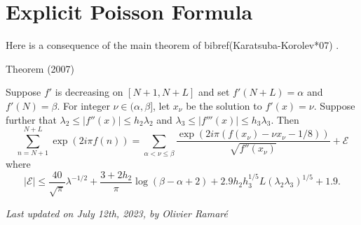 \par 
\section{Explicit Poisson Formula}


Here is a consequence of the main theorem of
bibref(Karatsuba-Korolev*07)
.
\par 
\begin{thm}{Theorem (2007)}

    Suppose $f'$ is decreasing on $[N+1,N+L]$ and set
    $f'(N+L)=\alpha$ and $f'(N) = \beta$.
    For integer $\nu\in(\alpha, \beta]$, let $x_\nu$ be the solution
    to $f'(x)=\nu$. Suppose further that
$\lambda_2\le |f''(x)|\le h_2\lambda_2$ and
    $\lambda_3\le |f'''(x)|\le h_3\lambda_3$. Then
    $$
    \sum_{n=N+1}^{N+L} \exp(2i\pi f(n))
    =
    \sum_{\alpha < \nu\le \beta}
		   \frac{\exp(2i\pi (f(x_\nu)-\nu x_\nu-1/8))}{\sqrt{f''(x_\nu)}}
		   +\mathcal{E}
    $$
		   where
		   $$
		   |\mathcal{E}|
		   \le \frac{40}{\sqrt{\pi}}\lambda^{-1/2}
		   + \frac{3+2h_2}{\pi} \log(\beta-\alpha+2)
		   + 2.9 h_2h_3^{1/5}L(\lambda_2\lambda_3)^{1/5}
		   +1.9.
		   $$
		   
\end{thm}








  
\begin{flushright}\small\sl{}   Last updated on July 12th, 2023, by Olivier Ramar\'e
 \end{flushright}















